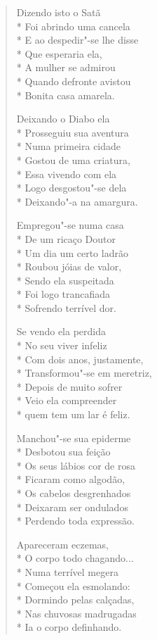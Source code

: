 \begin{verse}
Dizendo isto o Satã\\*
Foi abrindo uma cancela\\*
E ao despedir"-se lhe disse\\*
Que esperaria ela,\\*
A mulher se admirou\\*
Quando defronte avistou\\*
Bonita casa amarela.

Deixando o Diabo ela\\*
Prosseguiu sua aventura\\*
Numa primeira cidade\\*
Gostou de uma criatura,\\*
Essa vivendo com ela\\*
Logo desgostou"-se dela\\*
Deixando"-a na amargura.

Empregou"-se numa casa\\*
De um ricaço Doutor\\*
Um dia um certo ladrão\\*
Roubou jóias de valor,\\*
Sendo ela suspeitada\\*
Foi logo trancafiada\\*
Sofrendo terrível dor.

Se vendo ela perdida\\*
No seu viver infeliz\\*
Com dois anos, justamente,\\*
Transformou"-se em meretriz,\\*
Depois de muito sofrer\\*
Veio ela compreender\\*
quem tem um lar é feliz.

Manchou"-se sua epiderme\\*
Desbotou sua feição\\*
Os seus lábios cor de rosa\\*
Ficaram como algodão,\\*
Os cabelos desgrenhados\\*
Deixaram ser ondulados\\*
Perdendo toda expressão.

Apareceram eczemas,\\*
O corpo todo chagando...\\*
Numa terrível megera\\*
Começou ela esmolando:\\*
Dormindo pelas calçadas,\\*
Nas chuvosas madrugadas\\*
Ia o corpo definhando.


\end{verse}
